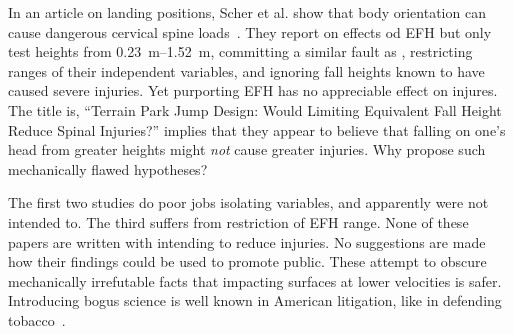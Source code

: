 \documentclass[smallextended]{svjour3}       %
\begin{document}

In an article on landing positions, Scher et al. show that body orientation can
cause dangerous cervical spine loads~\cite{Scher2015}. They report on effects
od EFH but only test heights from \SIrange{0.23}{1.52}{\meter}, committing a
similar fault as \cite{Shealy2010}, restricting ranges of their independent
variables, and ignoring fall heights known to have caused severe injuries. Yet
purporting EFH has no appreciable effect on injures. The title is, ``Terrain
Park Jump Design: Would Limiting Equivalent Fall Height Reduce Spinal
Injuries?'' implies that they appear to believe that falling on one's head from
greater heights might \emph{not} cause greater injuries.  Why propose such
mechanically flawed hypotheses?

The first two studies do poor jobs isolating variables, and apparently were not
intended to. The third suffers from restriction of EFH range. None of these
papers are written with intending to reduce injuries. No suggestions are made
how their findings could be used to promote public. These attempt to obscure
mechanically irrefutable facts that impacting  surfaces at  lower velocities is
safer. Introducing bogus science is well known in American litigation, like in
defending tobacco~\cite{Oreskes2010}.
\end{document}
